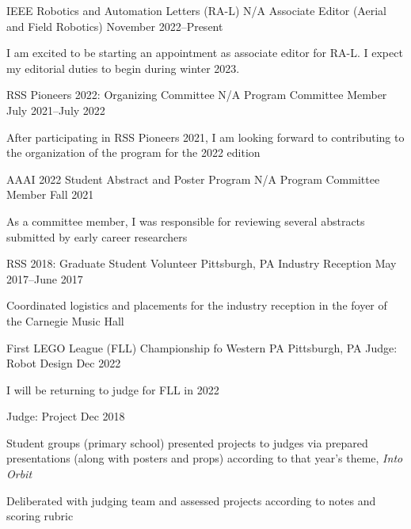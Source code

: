 
\begin{cventries}
  \cventry
  {IEEE Robotics and Automation Letters (RA-L)}
  {N/A}
  {Associate Editor (Aerial and Field Robotics)}
  {November 2022--Present}
  {
    \begin{cvitems}
      \item I am excited to be starting an appointment as associate editor for
        RA-L.
        I expect my editorial duties to begin during winter 2023.
    \end{cvitems}
  }
  \cventry
  {RSS Pioneers 2022: Organizing Committee}
  {N/A}
  {Program Committee Member}
  {July 2021--July 2022}
  {
    \begin{cvitems}
    \item After participating in RSS Pioneers 2021, I am looking forward to
      contributing to the organization of the program for the 2022 edition
    \end{cvitems}
  }
  \cventry
  {AAAI 2022 Student Abstract and Poster Program}
  {N/A}
  {Program Committee Member}
  {Fall 2021}
  {
    \begin{cvitems}
    \item As a committee member, I was responsible for reviewing several
      abstracts submitted by early career researchers
    \end{cvitems}
  }
  \cventry
  {RSS 2018: Graduate Student Volunteer}
  {Pittsburgh, PA}
  {Industry Reception}
  {May 2017--June 2017}
  {
    \begin{cvitems}
    \item Coordinated logistics and placements for the industry reception
      in the foyer of the Carnegie Music Hall
    \end{cvitems}
  }
  \cventrytwo
  {First LEGO League (FLL) Championship fo Western PA}
  {Pittsburgh, PA}
  {Judge: Robot Design}
  {Dec 2022}
  {
    \begin{cvitems}
    \item I will be returning to judge for FLL in 2022
    \end{cvitems}
  }
  {Judge: Project}
  {
    Dec 2018
  }
  {
    \begin{cvitems}
    \item Student groups (primary school) presented projects to judges via
      prepared presentations (along with posters and props) according to that
      year's theme, \emph{Into Orbit}
    \item Deliberated with judging team and assessed projects according to
      notes and scoring rubric
    \end{cvitems}
  }
\end{cventries}
